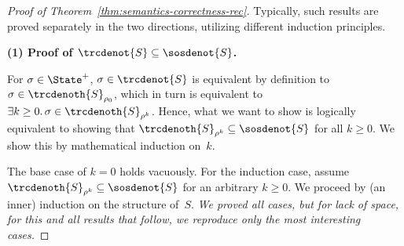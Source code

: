 \documentclass[a4paper,numberwithinsect]{lipics-v2021}
\begin{document}
\begin{proof}[Proof of Theorem~\ref{thm:semantics-correctness-rec}]
  
Typically, such results are proved separately in the two directions,
utilizing different induction principles.

\noindent\textbf{(1) Proof of $\trcdenot{S} \subseteq \sosdenot{S}$.}

For $\sigma \in \State^+$,
%
$\sigma \in \trcdenot{S}$ is equivalent by definition to
$\sigma \in \trcdenoth{S}_{\rho_0}$, which in turn is equivalent to
$\exists k \geq 0.\, \sigma \in \trcdenoth{S}_{\rho^k}$.
%
Hence, what we want to show is logically equivalent to showing that 
$\trcdenoth{S}_{\rho^k} \subseteq \sosdenot{S}$ for all $k \geq 0$. 
%
We show this by mathematical induction on~$k$.

The base case of $k = 0$ holds vacuously.
%
For the induction case, assume 
$\trcdenoth{S}_{\rho^k} \subseteq \sosdenot{S}$ for an
arbitrary $k \geq 0$.
%
We proceed by (an inner) induction on the structure of~$S$.
%
\emph{We proved all cases, but for lack of space, for this and all
  results that follow, we reproduce only the most interesting cases.}

\end{proof}
\end{document}
